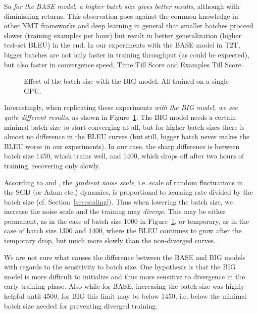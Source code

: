 \documentclass{pbmlarxiv} \pdfoutput=1
\def\recommend#1{\textsl{#1}}
\def\Sref#1{Section~\ref{#1}}
\def\Fref#1{Figure~\ref{#1}}
\def\parcite#1{\cite{#1}}
\begin{document}
So \recommend{for the BASE model, a higher batch size gives better results}, although with diminishing returns.
This observation goes against the common knowledge in other NMT frameworks and
 deep learning in general \parcite{keskar:etal:minibatches:iclr:2017}
 that smaller batches proceed slower (training examples per hour)
 but result in better generalization (higher test-set BLEU) in the end.
In our experiments with the BASE model in T2T,
 bigger batches are not only faster in training throughput (as could be expected),
 but also faster in convergence speed, Time Till Score and Examples Till Score.

\begin{figure}
\vspace{-5mm}
\caption{Effect of the batch size with the BIG model. All trained on a single GPU.}
\label{fig:1GPU-czeng57-batch-size}
\end{figure}

Interestingly, when replicating these experiments \recommend{with the BIG model,
 we see quite different results}, as shown in \Fref{fig:1GPU-czeng57-batch-size}.
The BIG model needs a certain minimal batch size to start converging at all,
 but for higher batch sizes there is almost no difference in the BLEU curves
 (but still, bigger batch never makes the BLEU worse in our experiments).
In our case, the sharp difference is between batch size 1450, which trains well,
 and 1400, which drops off after two hours of training, recovering only slowly.

According to \citet{smith:le:generalization:2017} and \citet{smith:etal:lr:batchsize:arxiv:2017},
 the \emph{gradient noise scale}, i.e. scale of random fluctuations in the SGD (or Adam etc.) dynamics,
 is proportional to learning rate divided by the batch size (cf. \Sref{sec:scaling}).
Thus when lowering the batch size, we increase the noise scale
 and the training may \emph{diverge}.
This may be either permanent,
 as in the case of batch size 1000 in \Fref{fig:1GPU-czeng57-batch-size},
 or temporary, as in the case of batch size 1300 and 1400,
 where the BLEU continues to grow after the temporary drop,
 but much more slowly than the non-diverged curves.

We are not sure what causes the difference between the BASE and BIG models
 with regards to the sensitivity to batch size.
One hypothesis is that the BIG model is more difficult to initialize
 and thus more sensitive to divergence in the early training phase.
Also while for BASE, increasing the batch size was highly helpful until 4500,
 for BIG this limit may be below 1450,
 i.e. below the minimal batch size needed for preventing diverged training.
\end{document}
